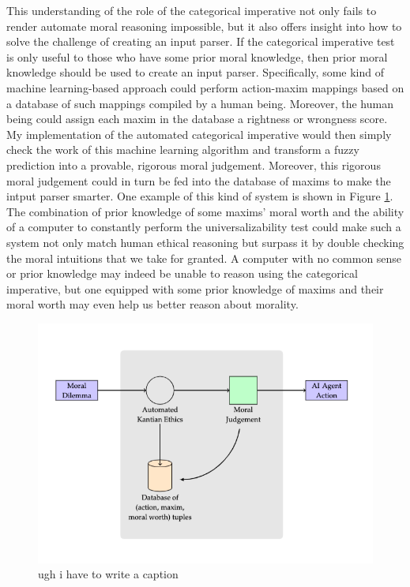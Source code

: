 \begin{isabellebody}
\begin{isamarkuptext}
This understanding of the role of the categorical imperative not only fails to render automate moral
reasoning impossible, but it also offers insight into how to solve the challenge of creating an input parser.
If the categorical imperative test is only useful to those who have some prior moral knowledge, then prior moral
knowledge should be used to create an input parser. Specifically, some kind of machine learning-based approach
could perform action-maxim mappings based on a database of such mappings compiled by a human being. Moreover, 
the human being could assign each maxim in the database a rightness or wrongness score. My implementation
of the automated categorical imperative would then simply check the work of this machine learning algorithm and transform
a fuzzy prediction into a provable, rigorous moral judgement. Moreover, this rigorous moral judgement
could in turn be fed into the database of maxims to make the intput parser smarter. One example of 
this kind of system is shown in Figure \ref{fig:inputparser}. The combination of 
prior knowledge of some maxims' moral worth and the ability of a computer to constantly perform the
universalizability test could make such a system not only match human ethical reasoning but surpass it
by double checking the moral intuitions that we take for granted. A computer with no common sense or prior knowledge
may indeed be unable to reason using the categorical imperative, but one equipped with some prior knowledge
of maxims and their moral worth may even help us better reason about morality.%
\end{isamarkuptext}\isamarkuptrue%
%
\begin{figure}
\centering
\includegraphics[scale=0.5]{inputparser.png}
\caption{ugh i have to write a caption} \label{fig:inputparser}
\end{figure}
%
\isadelimtheory
%
\endisadelimtheory
%
\isatagtheory
%
\endisatagtheory
{\isafoldtheory}%
%
\isadelimtheory
%
\endisadelimtheory
%
\end{isabellebody}%
